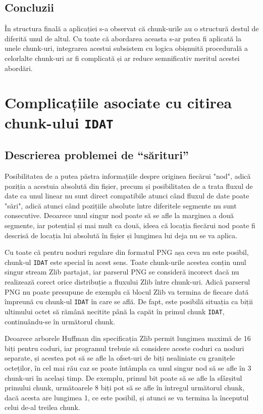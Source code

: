 \documentclass[a4paper,12pt]{report}
\begin{document}
\subsection{Concluzii}

În structura finală a aplicației s-a observat că chunk-urile au o structură destul de diferită unul de altul.
Cu toate că abordarea aceasta s-ar putea fi aplicată la unele chunk-uri,
integrarea acestui subsistem cu logica obișnuită procedurală a celorlalte chunk-uri
ar fi complicată și ar reduce semnificativ meritul acestei abordări. 

\section{Complicațiile asociate cu citirea chunk-ului \texttt{IDAT}}

\subsection{Descrierea problemei de ``sărituri''}

Posibilitatea de a putea păstra informațiile despre originea fiecărui "nod",
adică poziția a acestuia absolută din fișier,
precum și posibilitatea de a trata fluxul de date ca unul linear nu sunt direct compatibile
atunci când fluxul de date poate "sări", adică atunci când pozițiile absolute
între diferitele segmente nu sunt consecutive.
Deoarece unul singur nod poate să se afle la marginea a două segmente, iar potențial și mai mult ca două,
ideea că locația fiecărui nod poate fi descrisă de locația lui absolută în fișier și
lungimea lui deja nu se va aplica.

Cu toate că pentru noduri regulare din formatul \ac{PNG} așa ceva nu este posibil,
chunk-ul \texttt{IDAT} este special în acest sens.
Toate chunk-urile acestea conțin unul singur stream Zlib partajat,
iar parserul \ac{PNG} se consideră incorect dacă nu realizează corect
orice distribuție a fluxului Zlib între chunk-uri.
Adică parserul \ac{PNG} nu poate presupune de exemplu că blocul Zlib va termina de fiecare dată
împreună cu chunk-ul \texttt{IDAT} în care se află.
De fapt, este posibilă situația ca biții ultimului octet să rămână necitite până la capăt
în primul chunk \texttt{IDAT}, continuându-se în următorul chunk.

Deoarece arborele Huffman din specificația Zlib permit lungimea maximă de 16 biți pentru coduri,
iar programul trebuie să considere aceste coduri ca noduri separate,
și acestea pot să se afle la ofset-uri de biți nealiniate cu granițele octeților,
în cel mai rău caz se poate întâmpla ca unul singur nod să se afle în 3 chunk-uri în același timp.
De exemplu, primul bit poate să se afle la sfârșitul primului chunk,
următoarele 8 biți pot să se afle în întregul următorul chunk, dacă acesta are lungimea 1, ce este posibil,
și atunci se va termina la începutul celui de-al treilea chunk.
\end{document}
